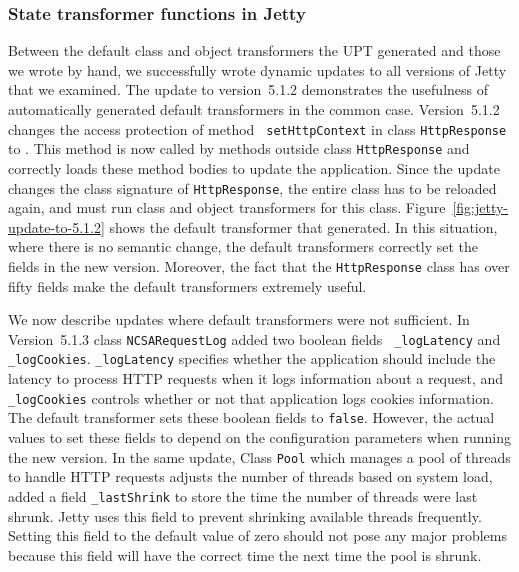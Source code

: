 \subsubsection{State transformer functions in Jetty}

Between the default class and object transformers the \acf{UPT} generated
and those we wrote by hand, we successfully wrote dynamic updates to all
versions of Jetty that we examined. The update to version~5.1.2 demonstrates
the usefulness of automatically generated default transformers in the
common case. Version~5.1.2 changes the access protection of method {\tt
setHttpContext} in class {\tt HttpResponse} to \public. This method is now
called by methods outside class {\tt HttpResponse}
and \JV correctly loads these method bodies to
update the application. Since the update changes the class signature of
{\tt HttpResponse}, the entire class has to be reloaded again, and \JV must
run class and object transformers for this class.
Figure~\ref{fig:jetty-update-to-5.1.2} shows the default transformer that
\UPT generated.
In this situation, where
there is no semantic change, the default transformers
correctly set the fields in the new version. Moreover, the fact that the
{\tt HttpResponse} class has over fifty fields make the default
transformers extremely useful.





We now describe updates where default transformers were not sufficient.  In
Version~5.1.3 class {\tt NCSARequestLog} added two boolean fields {\tt
\_logLatency} and {\tt \_logCookies}. {\tt \_logLatency} specifies whether
the application should include the latency to process HTTP requests when it
logs information about a request, and {\tt \_logCookies} controls whether
or not that application logs
cookies information. The default transformer sets these boolean
fields to {\tt false}. However, the actual values to set these fields to
depend on the configuration parameters when running the new version. In
the same update, Class {\tt Pool} which manages a pool of threads to handle
HTTP requests adjusts the number of threads based on system load, added a
\private field {\tt \_lastShrink} to store the time the number of threads
were last shrunk. Jetty uses this field to prevent shrinking
available threads frequently.  Setting this field to the default value of
zero should not pose any major problems because this field will have the
correct time the next time the pool is shrunk.


